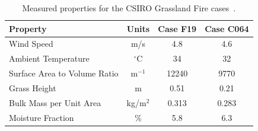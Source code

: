 \begin{table}[ht]
\begin{center}
\caption[Measured properties for the CSIRO Grassland Fire cases]{Measured properties for the CSIRO Grassland Fire cases~\cite{Cheney:IJWF1993}.}
\label{Properties_Grasses}
\begin{tabular}{|l|c|c|c|}
\hline
Property                        & Units         & Case F19      & Case C064     \\ \hline \hline
Wind Speed                      & m/s           & 4.8           & 4.6           \\ \hline
Ambient Temperature             & $^\circ$C     & 34            & 32            \\ \hline
Surface Area to Volume Ratio    & m$^{-1}$      & 12240         & 9770          \\ \hline
Grass Height                    & m             & 0.51          & 0.21          \\ \hline
Bulk Mass per Unit Area         & kg/m$^2$      & 0.313         & 0.283         \\ \hline
Moisture Fraction               & \%            & 5.8           & 6.3           \\ \hline
\end{tabular}
\end{center}
\end{table}


